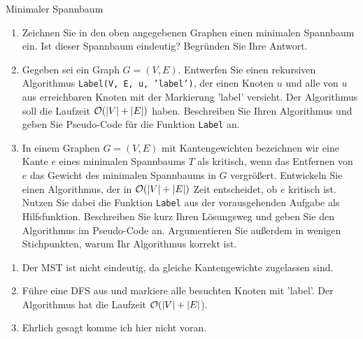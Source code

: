 \documentclass{article}
\begin{document}
\begin{exercise}{Minimaler Spannbaum}
  
  \begin{enumerate}
    \item Zeichnen Sie in den oben angegebenen Graphen einen minimalen Spannbaum ein. Ist dieser Spannbaum eindeutig? Begründen Sie Ihre Antwort.
    \item Gegeben sei ein Graph $G = (V,E)$. Entwerfen Sie einen rekursiven Algorithmus \texttt{Label(V, E, u, ’label’)}, der einen Knoten $u$ und alle von $u$ aus erreichbaren Knoten mit der Markierung ’label’ versieht. Der Algorithmus soll die Laufzeit $\mathcal{O}(|V| + |E|)$ haben. Beschreiben Sie Ihren Algorithmus und geben Sie Pseudo-Code für die Funktion \texttt{Label} an.
    \item In einem Graphen $G = (V,E)$ mit Kantengewichten bezeichnen wir eine Kante $e$ eines minimalen Spannbaums $T$ als kritisch, wenn das Entfernen von $e$ das Gewicht des minimalen Spannbaums in $G$ vergrößert. Entwickeln Sie einen Algorithmus, der in $\mathcal{O}(|V| + |E|)$ Zeit entscheidet, ob $e$ kritisch ist. Nutzen Sie dabei die Funktion \texttt{Label} aus der vorausgehenden Aufgabe als Hilfsfunktion. Beschreiben Sie kurz Ihren Lösungsweg und geben Sie den Algorithmus im Pseudo-Code an. Argumentieren Sie außerdem in wenigen Stichpunkten, warum Ihr Algorithmus korrekt ist.
  \end{enumerate}

  \begin{solution}
    \begin{enumerate}
      \item  Der MST ist nicht eindeutig, da gleiche Kantengewichte zugelassen sind.
      \item Führe eine DFS aus und markiere alle besuchten Knoten mit ’label’. Der Algorithmus hat die Laufzeit $\mathcal{O}(|V| + |E|$).
            
      \item Ehrlich gesagt komme ich hier nicht voran. %
    \end{enumerate}
  \end{solution}
\end{exercise}
\end{document}
